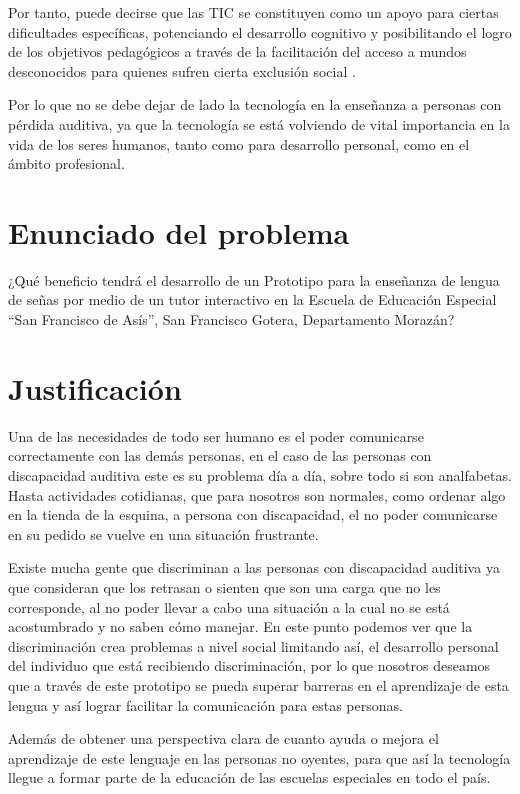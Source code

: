 \documentclass[12pt]{report}%
\begin{document}
Por tanto, puede decirse que las TIC  se constituyen como un apoyo para ciertas dificultades específicas, potenciando el desarrollo cognitivo y posibilitando el logro de los objetivos pedagógicos a través de la facilitación del acceso a mundos desconocidos para quienes sufren cierta exclusión social . 

Por lo que no se debe dejar de lado la tecnología en la enseñanza a personas con pérdida auditiva, ya que la tecnología se está volviendo de vital importancia en la vida de los seres humanos, tanto como para desarrollo personal, como en el ámbito profesional.

\section{Enunciado del problema}
¿Qué beneficio tendrá el desarrollo de un Prototipo para la enseñanza de lengua de señas por medio de un tutor interactivo en la Escuela de Educación Especial “San Francisco de Asís”, San Francisco Gotera, Departamento Morazán?

\section{Justificación}
Una de las necesidades de todo ser humano es el poder comunicarse correctamente con las demás personas, en el caso de las personas con discapacidad auditiva este es su problema día a día, sobre todo si son analfabetas. Hasta actividades cotidianas, que para nosotros son normales, como ordenar algo en la tienda de la esquina, a persona con discapacidad, el no poder comunicarse en su pedido se vuelve en una situación frustrante.

Existe mucha gente que discriminan a las personas con discapacidad auditiva ya que consideran que los retrasan o sienten que son una carga que no les corresponde, al no poder llevar a cabo una situación a la cual no se está acostumbrado y no saben cómo manejar.
En este punto podemos ver que la discriminación crea problemas a nivel social limitando así, el desarrollo personal del individuo que está recibiendo discriminación, por lo que nosotros deseamos que a través de este prototipo se pueda superar barreras en el aprendizaje de esta lengua y así lograr facilitar la comunicación para estas personas.

Además de obtener una perspectiva clara de cuanto ayuda o mejora el aprendizaje de este lenguaje en las personas no oyentes, para que así la tecnología llegue a formar parte de la educación de las escuelas especiales en todo el país.
\end{document}
